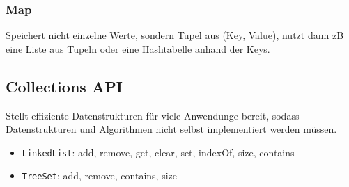 \documentclass[12pt,a4]{article}
\begin{document}
	\subsubsection{Map}
	Speichert nicht einzelne Werte, sondern Tupel aus (Key, Value), nutzt dann zB eine Liste aus Tupeln oder eine Hashtabelle anhand der Keys.
	
	\subsection{Collections API}
	Stellt effiziente Datenstrukturen für viele Anwendunge bereit, sodass Datenstrukturen und Algorithmen nicht selbst implementiert werden müssen.
	
	\begin{itemize}
		\item \texttt{LinkedList}: add, remove, get, clear, set, indexOf, size, contains
		\item \texttt{TreeSet}: add, remove, contains, size
	\end{itemize}
	
	
	
	
	
	
	
	
	
\end{document}
